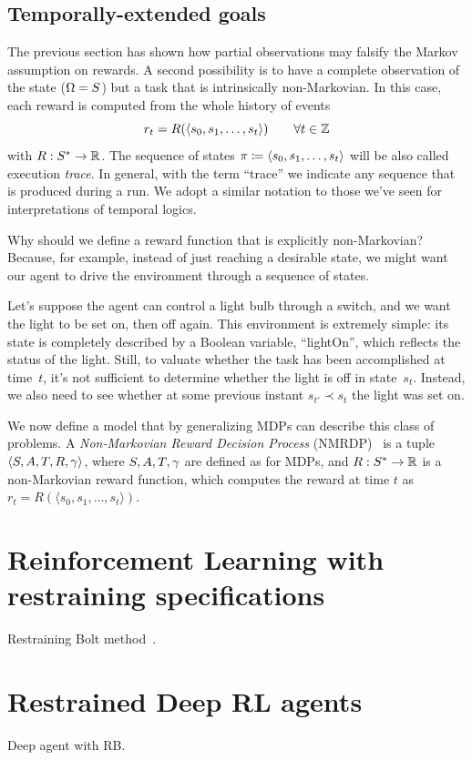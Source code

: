 \subsection{Temporally-extended goals}

The previous section has shown how partial observations may falsify the Markov
assumption on rewards. A second possibility is to have a complete observation
of the state ($\Omega = S$) but a task that is intrinsically
non-Markovian. In this case, each reward is computed from the whole history
of events
\begin{equation}
	r_t = R(\langle s_0, s_1, \dots, s_t \rangle) \qquad \forall t \in \mathbb{Z}
\end{equation}
with $R: S^* \to \mathbb{R}$. The sequence of states $\pi
\coloneqq \langle s_0, s_1, \dots, s_t \rangle$ will be also called
execution \emph{trace}. In general, with the term ``trace'' we indicate any
sequence that is produced during a run. We adopt a similar notation to those
we've seen for interpretations of temporal logics.

Why should we define a reward function that is explicitly non-Markovian?
Because, for example, instead of just reaching a desirable state, we might
want our agent to drive the environment through a sequence of states.

\begin{example}
	Let's suppose the agent can control a light bulb through a switch, and we
	want the light to be set on, then off again. This environment is extremely
	simple: its state is completely described by a Boolean variable,
	``lightOn'', which reflects the status of the light. Still, to valuate
	whether the task has been accomplished at time~$t$, it's not sufficient to
	determine whether the light is off in state~$s_t$. Instead, we also need to
	see whether at some previous instant $s_{t'} \prec s_t$ the light was set
	on.
\end{example}

We now define a model that by generalizing MDPs can describe this class of
problems. A \emph{Non-Markovian Reward Decision Process}
(NMRDP)~\cite{bib:nmrdp-logic-first} is a tuple $\langle S, A, T, R,
\gamma \rangle$, where $S, A, T, \gamma$ are defined as for MDPs,
and $R: S^* \to \mathbb{R}$ is a non-Markovian reward function, which computes
the reward at time $t$ as $r_t = R(\langle s_0, s_1, \dots, s_t \rangle)$.




\section{Reinforcement Learning with restraining specifications}

\label{sec:rb}

Restraining Bolt method~\cite{bib:bolt}\cite{bib:rb-imitation-l}.


\section{Restrained Deep RL agents}

\label{sec:rb-deep-model}

Deep agent with RB.
